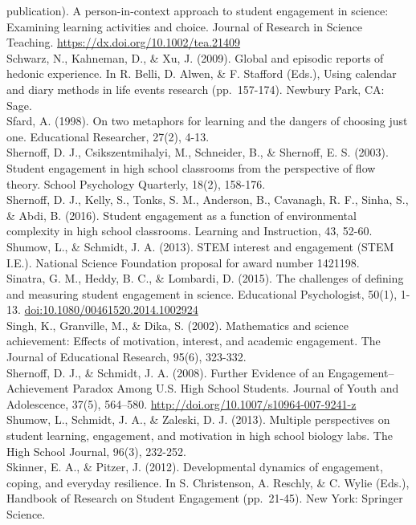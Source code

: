 \documentclass[]{book}
\theoremstyle{definition}
\theoremstyle{definition}
\theoremstyle{definition}
\theoremstyle{remark}
\begin{document}
publication). A person-in-context approach to student engagement in
science: Examining learning activities and choice. Journal of Research
in Science Teaching. \url{https://dx.doi.org/10.1002/tea.21409}\\
Schwarz, N., Kahneman, D., \& Xu, J. (2009). Global and episodic reports
of hedonic experience. In R. Belli, D. Alwen, \& F. Stafford (Eds.),
Using calendar and diary methods in life events research (pp.~157-174).
Newbury Park, CA: Sage.\\
Sfard, A. (1998). On two metaphors for learning and the dangers of
choosing just one. Educational Researcher, 27(2), 4-13.\\
Shernoff, D. J., Csikszentmihalyi, M., Schneider, B., \& Shernoff, E. S.
(2003). Student engagement in high school classrooms from the
perspective of flow theory. School Psychology Quarterly, 18(2),
158-176.\\
Shernoff, D. J., Kelly, S., Tonks, S. M., Anderson, B., Cavanagh, R. F.,
Sinha, S., \& Abdi, B. (2016). Student engagement as a function of
environmental complexity in high school classrooms. Learning and
Instruction, 43, 52-60.\\
Shumow, L., \& Schmidt, J. A. (2013). STEM interest and engagement (STEM
I.E.). National Science Foundation proposal for award number 1421198.\\
Sinatra, G. M., Heddy, B. C., \& Lombardi, D. (2015). The challenges of
defining and measuring student engagement in science. Educational
Psychologist, 50(1), 1-13. \url{doi:10.1080/00461520.2014.1002924}\\
Singh, K., Granville, M., \& Dika, S. (2002). Mathematics and science
achievement: Effects of motivation, interest, and academic engagement.
The Journal of Educational Research, 95(6), 323-332.\\
Shernoff, D. J., \& Schmidt, J. A. (2008). Further Evidence of an
Engagement--Achievement Paradox Among U.S. High School Students. Journal
of Youth and Adolescence, 37(5), 564--580.
\url{http://doi.org/10.1007/s10964-007-9241-z}\\
Shumow, L., Schmidt, J. A., \& Zaleski, D. J. (2013). Multiple
perspectives on student learning, engagement, and motivation in high
school biology labs. The High School Journal, 96(3), 232-252.\\
Skinner, E. A., \& Pitzer, J. (2012). Developmental dynamics of
engagement, coping, and everyday resilience. In S. Christenson, A.
Reschly, \& C. Wylie (Eds.), Handbook of Research on Student Engagement
(pp.~21-45). New York: Springer Science.\\
\end{document}

